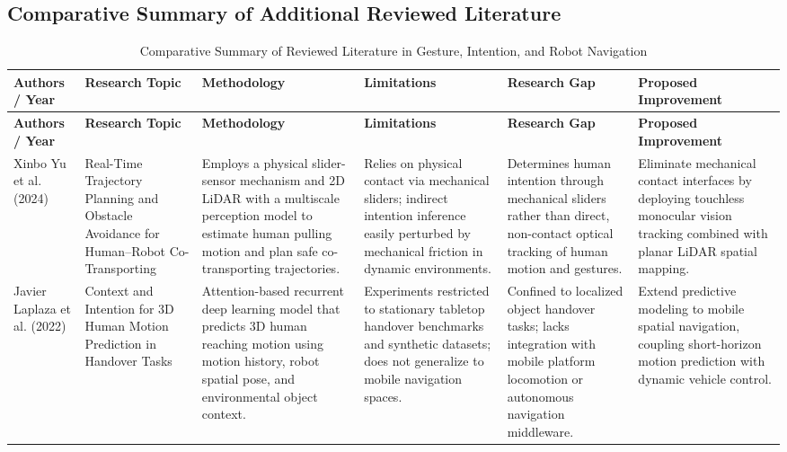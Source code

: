 \begin{landscape}
\section{Comparative Summary of Additional Reviewed Literature}

\footnotesize
\begin{longtable}{|
>{\RaggedRight\arraybackslash}p{3.2cm}|
>{\RaggedRight\arraybackslash}p{3.5cm}|
>{\RaggedRight\arraybackslash}p{5.2cm}|
>{\RaggedRight\arraybackslash}p{3.8cm}|
>{\RaggedRight\arraybackslash}p{3.8cm}|
>{\RaggedRight\arraybackslash}p{3.8cm}|
}
\caption{Comparative Summary of Reviewed Literature in Gesture, Intention, and Robot Navigation}
\label{tab:lit_review_landscape}\\
\hline
\textbf{Authors / Year} & \textbf{Research Topic} & \textbf{Methodology} & \textbf{Limitations} & \textbf{Research Gap} & \textbf{Proposed Improvement} \\
\hline
\endfirsthead

\hline
\textbf{Authors / Year} & \textbf{Research Topic} & \textbf{Methodology} & \textbf{Limitations} & \textbf{Research Gap} & \textbf{Proposed Improvement} \\
\hline
\endhead

Xinbo Yu et al. (2024) \cite{yu2024} &
Real-Time Trajectory Planning and Obstacle Avoidance for Human--Robot Co-Transporting &
Employs a physical slider-sensor mechanism and 2D LiDAR with a multiscale perception model to estimate human pulling motion and plan safe co-transporting trajectories. &
Relies on physical contact via mechanical sliders; indirect intention inference easily perturbed by mechanical friction in dynamic environments. &
Determines human intention through mechanical sliders rather than direct, non-contact optical tracking of human motion and gestures. &
Eliminate mechanical contact interfaces by deploying touchless monocular vision tracking combined with planar LiDAR spatial mapping. \\
\hline

Javier Laplaza et al. (2022) \cite{laplaza2022} &
Context and Intention for 3D Human Motion Prediction in Handover Tasks &
Attention-based recurrent deep learning model that predicts 3D human reaching motion using motion history, robot spatial pose, and environmental object context. &
Experiments restricted to stationary tabletop handover benchmarks and synthetic datasets; does not generalize to mobile navigation spaces. &
Confined to localized object handover tasks; lacks integration with mobile platform locomotion or autonomous navigation middleware. &
Extend predictive modeling to mobile spatial navigation, coupling short-horizon motion prediction with dynamic vehicle control. \\
\hline


\end{longtable}
\end{landscape}
